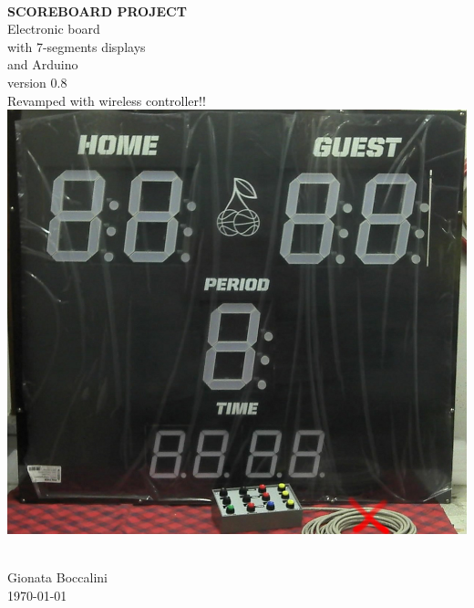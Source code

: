 \documentclass[11pt,english]{article}
\begin{document}
\begin{titlepage}
\begin{center} 

~\\[1.5cm] 
\textbf{{\Huge SCOREBOARD PROJECT}
~\\[0.7cm]}
\LARGE{Electronic board \\
with 7-segments displays\\
and Arduino
~\\[0.8cm]
version 0.8}
\large{~\\[0.8cm]
Revamped with wireless controller!!}
~\\[1.6cm]

\includegraphics[scale=0.30]{img/Scoreboard}

~\\[1.5cm]
\normalsize Gionata Boccalini
~\\[0.5cm]
\normalsize \today

\end{center} 
\vspace*{1cm}
\end{titlepage}


\newpage{}

\tableofcontents{}


\listoffigures

\lstlistoflistings

\newpage{}
\end{document}
